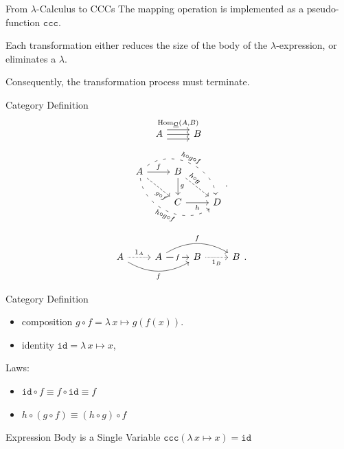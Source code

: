 \documentclass[10pt]{beamer}
\newcommand{\Cat}[1]{\ensuremath{\underline{\mathbf{#1}}}}
\newcommand{\Hom}[3]{\ensuremath{\mathrm{Hom}_{\Cat{#1}}(#2,#3)}}
\newcommand{\id}{\mathtt{id}}
\newcommand{\lamf}[2]{\ensuremath{\lambda\, #1 \mapsto #2}}
\newcommand{\ccc}{\ensuremath{\mathtt{ccc}}}
\newcommand{\lamtoccc}[1]{\ensuremath{\ccc (#1)}}
\theoremstyle{definition}
\theoremstyle{remark}
\numberwithin{equation}{section}
\begin{document}
\begin{frame}[fragile]{From $\lambda$-Calculus to CCCs}
  The mapping operation is implemented as a pseudo-function $\ccc$.

  Each transformation either reduces the size of the body of the $\lambda$-expression,
  or eliminates a $\lambda$.

  Consequently, the transformation process must terminate.
\end{frame}

\begin{frame}[fragile]{Category Definition}
  \[
    \begin{tikzcd}
      A \arrow[shift left=2]{r}{\Hom{C}{A}{B}} \arrow{r} \arrow[shift right=2]{r} & B
    \end{tikzcd}
  \]
  \[
  \begin{tikzcd}
    A \arrow{r}{f} \arrow[sloped,near end,swap,dashed]{dr}{g \circ f} \arrow[bend
      right=60,sloped,swap,loosely dashed]{drr}{h \circ g \circ f} \arrow[bend
      left=60,sloped,loosely dashed]{drr}{h
      \circ g \circ f} & B \arrow{d}{g}
    \arrow[sloped,near start,dashed]{dr}{h \circ g} & \\
    & C \arrow[swap]{r}{h} & D
  \end{tikzcd}\rlap{.}
  \]
  \[
  \begin{tikzcd}
    A \arrow[densely dotted]{r}{1_A} \arrow[bend right=30,swap]{rr}{f} & A
    \arrow["f" description]{r}
    \arrow[bend left=30]{rr}{f} & B \arrow[swap,densely dotted]{r}{1_B} & B
  \end{tikzcd}\rlap{.}
  \]
\end{frame}

\begin{frame}[fragile]{Category Definition}
  \begin{itemize}
  \item composition $g \circ f = \lamf{x}{g(f(x))}$.
  \item identity $\id = \lamf{x}{x} $,
  \end{itemize}
  
  Laws:\\
  \begin{itemize}
  \item $\id \circ f \equiv f \circ \id \equiv f$
  \item $h \circ (g \circ f) \equiv (h \circ g) \circ f$
  \end{itemize}
\end{frame}

\begin{frame}[fragile]{Expression Body is a Single Variable}
  $\lamtoccc{\lamf{x}{x}} = \id$
\end{frame}
\end{document}
